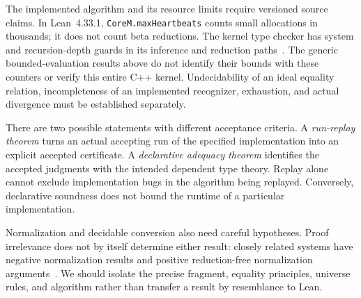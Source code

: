 \documentclass[11pt]{article}
\newcommand{\code}[1]{\nolinkurl{#1}}
\begin{document}
The implemented algorithm and its resource limits require versioned source
claims. In Lean~4.33.1, \code{CoreM.maxHeartbeats} counts small allocations in
thousands; it does not count beta reductions. The kernel type checker has
system and recursion-depth guards in its inference and reduction
paths~\cite{leansource}. The generic bounded-evaluation results above do not
identify their bounds with these counters or verify this entire C++ kernel.
Undecidability of an ideal equality relation, incompleteness of an implemented
recognizer, exhaustion, and actual divergence must be established separately.

There are two possible statements with different acceptance criteria.
A \emph{run-replay theorem} turns an actual accepting run of the specified
implementation into an explicit accepted certificate. A \emph{declarative
adequacy theorem} identifies the accepted judgments with the intended
dependent type theory. Replay alone cannot exclude implementation bugs
in the algorithm being replayed. Conversely, declarative soundness does
not bound the runtime of a particular implementation.

Normalization and decidable conversion also need careful hypotheses.
Proof irrelevance does not by itself determine either result: closely
related systems have negative normalization results and positive
reduction-free normalization arguments~\cite{abelcoquand,coquand}.
We should isolate the precise fragment, equality principles, universe
rules, and algorithm rather than transfer a result by resemblance to Lean.
\end{document}
